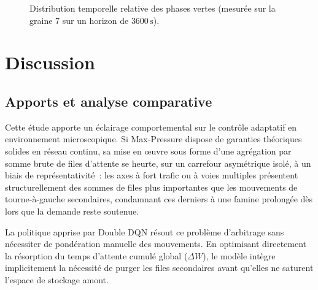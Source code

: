 \documentclass[10pt,twocolumn,letterpaper]{article}
\begin{document}
\begin{figure}[t]
\centering
{}
\caption{Distribution temporelle relative des phases vertes (mesurée sur la graine 7 sur un horizon de $3600\,\mathrm{s}$).}
\label{fig:stacked_distribution}
\end{figure}

\section{Discussion}
\label{sec:discussion}

\subsection{Apports et analyse comparative}
Cette étude apporte un éclairage comportemental sur le contrôle adaptatif en environnement microscopique. Si Max-Pressure dispose de garanties théoriques solides en réseau continu, sa mise en œuvre sous forme d'une agrégation par somme brute de files d'attente se heurte, sur un carrefour asymétrique isolé, à un biais de représentativité~: les axes à fort trafic ou à voies multiples présentent structurellement des sommes de files plus importantes que les mouvements de tourne-à-gauche secondaires, condamnant ces derniers à une famine prolongée dès lors que la demande reste soutenue.

La politique apprise par Double DQN résout ce problème d'arbitrage sans nécessiter de pondération manuelle des mouvements. En optimisant directement la résorption du temps d'attente cumulé global ($\Delta W$), le modèle intègre implicitement la nécessité de purger les files secondaires avant qu'elles ne saturent l'espace de stockage amont.
\end{document}
